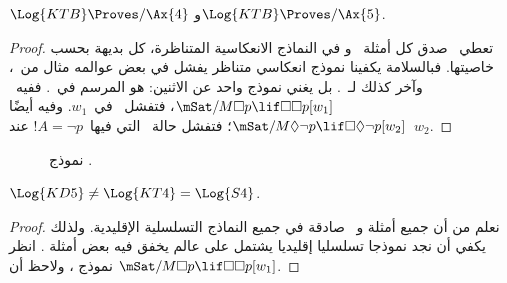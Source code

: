 \documentclass[../../../include/open-logic-section]{subfiles}
\begin{document}
\begin{thm}
  $\Log{KTB} \Proves/ \Ax{4}$ و$\Log{KTB} \Proves/ \Ax{5}$.
\end{thm}

\begin{proof}
  تعطي~ صدق كل أمثلة~
  و في النماذج الانعكاسية المتناظرة، كل بديهة بحسب خاصيتها.
  فبالسلامة يكفينا نموذج انعكاسي متناظر يفشل في بعض عوالمه مثال
  من~، وآخر كذلك لـ~. بل يغني نموذج واحد عن الاثنين:
  هو المرسم في~.
  ففيه~$\mSat/{M}{\Box p \lif \Box \Box p}[w_1]$، فتفشل~
  في~$w_1$. وفيه أيضًا
  $\mSat/{M}{\Diamond \lnot p \lif \Box \Diamond \lnot
    p}[w_2]$؛ فتفشل حالة~ التي فيها~$!A = \lnot p$ عند~$w_2$.
\end{proof}

\begin{figure}[htpb]
  \centering
  \caption{نموذج .}
\end{figure}

\begin{thm}
  $\Log{KD5} \neq \Log{KT4} = \Log{S4}$.
\end{thm}

\begin{proof}
  نعلم من  أن جميع أمثلة 
  و~ صادقة في جميع النماذج التسلسلية الإقليدية. ولذلك يكفي أن
  نجد نموذجا تسلسليا إقليديا يشتمل على عالم يخفق فيه بعض أمثلة
  . انظر نموذج ، ولاحظ أن
  $\mSat/{M}{\Box p \lif \Box\Box p}[w_1]$.
\end{proof}
\end{document}

